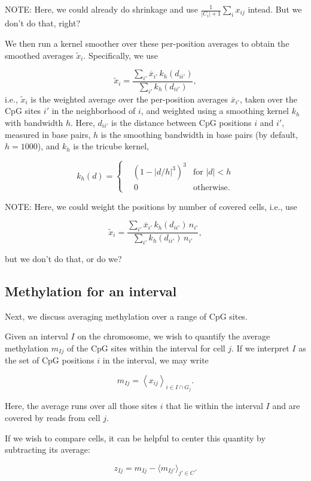 \documentclass[twocolumn,10pt]{article}
\begin{document}
NOTE: Here, we could already do shrinkage and use $\frac{1}{|C_i|+1}\sum_i x_{ij}$ intead. But we don't do that, right?

We then run a kernel smoother over these per-position averages to obtain the smoothed averages $\tilde x_i$. Specifically, we use

\[ \tilde x_i = \frac{\sum_{i'} \overline x_{i'}\, k_h(d_{ii'})}{\sum_{i'} k_h(d_{ii'})},\]
i.e., $\tilde x_i$ is the weighted average over the per-position averages $\overline{x}_{i'}$, taken over the CpG sites $i'$ in the neighborhood of $i$, and weighted using a smoothing kernel $k_h$ with bandwidth $h$. Here, $d_{ii'}$ is the distance between CpG positions $i$ and $i'$, measured in base pairs, $h$ is the smoothing bandwidth in base pairs (by default, $h=1000$), and $k_h$ is the tricube kernel,

\[ k_h(d) = \left\{
\begin{aligned}
	&\left(1-|d/h|^3\right)^3 &\text{for } |d|<h \\
	&\,0 &\text{otherwise}. 
\end{aligned}
\right.
\]

NOTE: Here, we could weight the positions by number of covered cells, i.e., use

$$ \tilde x_i = \frac{\sum_{i'} \overline x_{i'}\, k_h(d_{ii'})\, n_{i'}}{\sum_{i'} k_h(d_{ii'})\, n_{i'}},$$

but we don't do that, or do we?


\subsection{Methylation for an interval}

Next, we discuss averaging methylation over a range of CpG sites.

Given an interval $I$ on the chromosome, we wish to quantify the average methylation $m_{Ij}$ of the CpG sites within the interval for cell $j$. If we interpret $I$ as the set of CpG positions $i$ in the interval, we may write

$$ m_{Ij} = \left< x_{ij} \right>_{i\in I\cap G_j}.$$

Here, the average runs over all those sites $i$ that lie within the interval $I$ and are covered by reads from cell $j$.

If we wish to compare cells, it can be helpful to center this quantity by subtracting its average:

$$ z_{Ij} = m_{Ij} - \langle m_{Ij'}\rangle_{j'\in C}.$$
\end{document}
